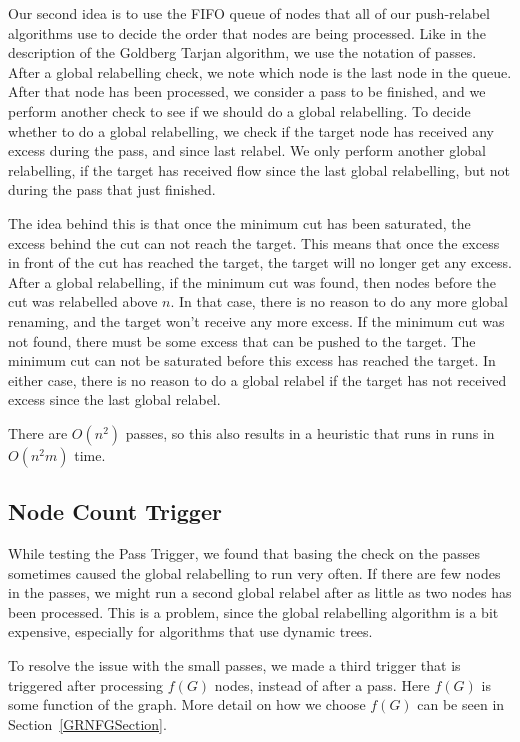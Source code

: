 Our second idea is to use the FIFO queue of nodes that all of our push-relabel algorithms use to decide the order that nodes are being processed.
Like in the description of the Goldberg Tarjan algorithm, we use the notation of passes.
After a global relabelling check, we note which node is the last node in the queue. 
After that node has been processed, we consider a pass to be finished, and we perform another check to see if we should do a global relabelling.
To decide whether to do a global relabelling, we check if the target node has received any excess during the pass, and since last relabel.
We only perform another global relabelling, if the target has received flow since the last global relabelling, but not during the pass that just finished.

The idea behind this is that once the minimum cut has been saturated, the excess behind the cut can not reach the target. 
This means that once the excess in front of the cut has reached the target, the target will no longer get any excess.
After a global relabelling, if the minimum cut was found, then nodes before the cut was relabelled above $n$. 
In that case, there is no reason to do any more global renaming, and the target won't receive any more excess.
If the minimum cut was not found, there must be some excess that can be pushed to the target. The minimum cut can not be saturated before this excess has reached the target.
In either case, there is no reason to do a global relabel if the target has not received excess since the last global relabel.

There are $O(n^2)$ passes, so this also results in a heuristic that runs in runs in $O(n^2m)$ time. 

\subsection{Node Count Trigger}
While testing the Pass Trigger, we found that basing the check on the passes sometimes caused the global relabelling to run very often. 
If there are few nodes in the passes, we might run a second global relabel after as little as two nodes has been processed.
This is a problem, since the global relabelling algorithm is a bit expensive, especially for algorithms that use dynamic trees. 

To resolve the issue with the small passes, we made a third trigger that is triggered after processing $f(G)$ nodes, instead of after a pass. 
Here $f(G)$ is some function of the graph. More detail on how we choose $f(G)$ can be seen in Section~\ref{GRNFGSection}.

